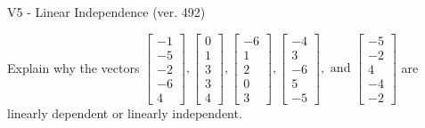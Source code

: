 \begin{exercise}
  \begin{exerciseTitle}V5 - Linear Independence (ver. 492)\end{exerciseTitle}
  \begin{exerciseStatement}
    Explain why the vectors \(\left[\begin{array}{r}
-1 \\
-5 \\
-2 \\
-6 \\
4
\end{array}\right] , \left[\begin{array}{r}
0 \\
1 \\
3 \\
3 \\
4
\end{array}\right] , \left[\begin{array}{r}
-6 \\
1 \\
2 \\
0 \\
3
\end{array}\right] , \left[\begin{array}{r}
-4 \\
3 \\
-6 \\
5 \\
-5
\end{array}\right] , \text{ and } \left[\begin{array}{r}
-5 \\
-2 \\
4 \\
-4 \\
-2
\end{array}\right]\) are linearly dependent or linearly independent.	



\end{exerciseStatement}
\end{exercise}
